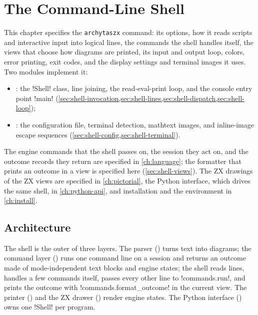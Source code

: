 \chapter{The Command-Line Shell}\label{ch:shell}

This chapter specifies the \texttt{archytaszx} command: its options, how it reads scripts and interactive input into logical lines, the commands the shell handles itself, the views that choose how diagrams are printed, its input and output loop, colors, error printing, exit codes, and the display settings and terminal images it uses. Two modules implement it:
\begin{itemize}
\item {}: the \py!Shell! class, line joining, the read-eval-print loop, and the console entry point \py!main! (\cref{sec:shell-invocation,sec:shell-lines,sec:shell-dispatch,sec:shell-loop});
\item {}: the configuration file, terminal detection, mathtext images, and inline-image escape sequences (\cref{sec:shell-config,sec:shell-terminal}).
\end{itemize}
The engine commands that the shell passes on, the session they act on, and the outcome records they return are specified in \cref{ch:language}; the formatter that prints an outcome in a view is specified here (\cref{sec:shell-views}). The ZX drawings of the ZX views are specified in \cref{ch:pictorial}, the Python interface, which drives the same shell, in \cref{ch:python-api}, and installation and the environment in \cref{ch:install}.

\section{Architecture}\label{sec:shell-architecture}

The shell is the outer of three layers. The parser () turns text into diagrams; the command layer () runs one command line on a session and returns an outcome made of mode-independent text blocks and engine states; the shell reads lines, handles a few commands itself, passes every other line to \py!commands.run!, and prints the outcome with \py!commands.format_outcome! in the current view. The printer () and the ZX drawer () render engine states. The Python interface () owns one \py!Shell! per program.


